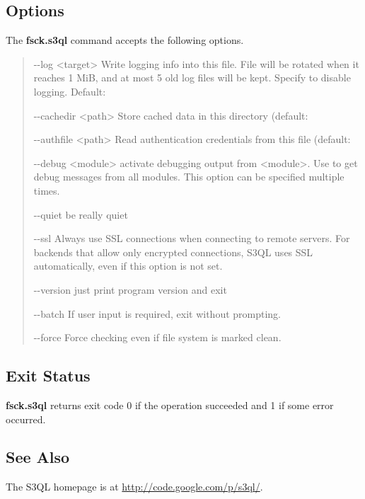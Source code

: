 \documentclass[letterpaper,10pt,english]{sphinxmanual}
\begin{document}
\subsection{Options}
\label{man/fsck:options}
The \textbf{fsck.s3ql} command accepts the following options.
\begin{quote}
\begin{optionlist}{3cm}
\item [-{-}log \textless{}target\textgreater{}]  
Write logging info into this file. File will be rotated
when it reaches 1 MiB, and at most 5 old log files will
be kept. Specify  to disable logging. Default:
\item [-{-}cachedir \textless{}path\textgreater{}]  
Store cached data in this directory (default: 
\item [-{-}authfile \textless{}path\textgreater{}]  
Read authentication credentials from this file (default:
\item [-{-}debug \textless{}module\textgreater{}]  
activate debugging output from \textless{}module\textgreater{}. Use  to get
debug messages from all modules. This option can be
specified multiple times.
\item [-{-}quiet]  
be really quiet
\item [-{-}ssl]  
Always use SSL connections when connecting to remote
servers. For backends that allow only encrypted
connections, S3QL uses SSL automatically, even if this
option is not set.
\item [-{-}version]  
just print program version and exit
\item [-{-}batch]  
If user input is required, exit without prompting.
\item [-{-}force]  
Force checking even if file system is marked clean.
\end{optionlist}
\end{quote}


\subsection{Exit Status}
\label{man/fsck:exit-status}
\textbf{fsck.s3ql} returns exit code 0 if the operation succeeded and 1 if some
error occurred.


\subsection{See Also}
\label{man/fsck:see-also}
The S3QL homepage is at \href{http://code.google.com/p/s3ql/}{http://code.google.com/p/s3ql/}.
\end{document}
